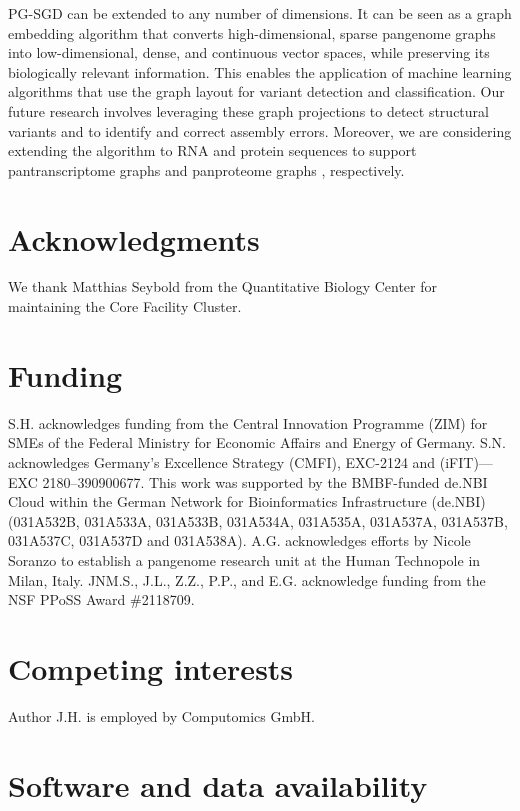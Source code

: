 \documentclass{bioinfo}
\theoremstyle{definition}
\begin{document}
	PG-SGD can be extended to any number of dimensions.
	It can be seen as a graph embedding algorithm that converts high-dimensional, sparse pangenome graphs into low-dimensional, dense, and continuous vector spaces, while preserving its biologically relevant information.
	This enables the application of machine learning algorithms that use the graph layout for variant detection and classification. 
	Our future research involves leveraging these graph projections to detect structural variants and to identify and correct assembly errors. 
	Moreover, we are considering extending the algorithm to RNA and protein sequences to support pantranscriptome graphs \citep{sibbesen_haplotype-aware_2023} and panproteome graphs \citep{dabbaghie_panpa:_2023}, respectively.

	\section*{Acknowledgments}

	We thank Matthias Seybold from the Quantitative Biology Center for maintaining the Core Facility Cluster.
	
	\section*{Funding}
	
	S.H. acknowledges funding from the Central Innovation Programme (ZIM) for SMEs of the Federal Ministry for Economic Affairs and Energy of Germany.
	S.N. acknowledges Germany’s Excellence Strategy (CMFI), EXC-2124 and (iFIT)—EXC 2180–390900677.
	This work was supported by the BMBF-funded de.NBI Cloud within the German Network for Bioinformatics Infrastructure (de.NBI) (031A532B, 031A533A, 031A533B, 031A534A, 031A535A, 031A537A, 031A537B, 031A537C, 031A537D and 031A538A).
	A.G. acknowledges efforts by Nicole Soranzo to establish a pangenome research unit at the Human Technopole in Milan, Italy.
	JNM.S., J.L., Z.Z., P.P., and E.G. acknowledge funding from the NSF PPoSS Award \#2118709.
	
	\section*{Competing interests}
	Author J.H. is employed by Computomics GmbH.
	
	\section*{Software and data availability}
	
\end{document}
